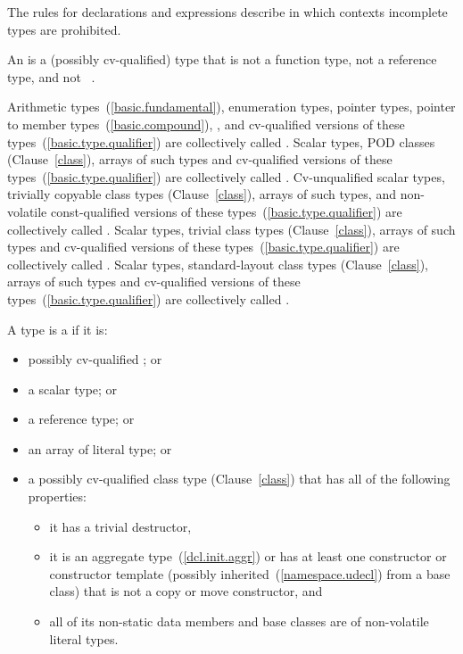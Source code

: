 \pnum
\enternote The rules for declarations and expressions describe in which
contexts incomplete types are prohibited. \exitnote

\pnum
{}%
An  is a (possibly cv-qualified) type that is not
a function type, not a reference type, and not \cv\ .

\pnum
Arithmetic types~(\ref{basic.fundamental}), enumeration types, pointer
types, pointer to member types~(\ref{basic.compound}),
,
and
cv-qualified versions of these
types~(\ref{basic.type.qualifier}) are collectively called
%
. Scalar types,
POD classes (Clause~\ref{class}), arrays of such types and
cv-qualified versions of these
types~(\ref{basic.type.qualifier}) are collectively called
%
.
Cv-unqualified scalar types, trivially copyable class types (Clause~\ref{class}), arrays of
such types, and non-volatile const-qualified versions of these
types~(\ref{basic.type.qualifier}) are collectively called .
Scalar types, trivial class types (Clause~\ref{class}),
arrays of such types and cv-qualified versions of these
types~(\ref{basic.type.qualifier}) are collectively called
. Scalar types, standard-layout class
types (Clause~\ref{class}), arrays of such types and
cv-qualified versions of these types~(\ref{basic.type.qualifier})
are collectively called .

\pnum
A type is a  if it is:

\begin{itemize}
\item possibly cv-qualified ; or
\item a scalar type; or
\item a reference type; or
\item an array of literal type; or
\item a possibly cv-qualified class type (Clause~\ref{class}) that
has all of the following properties:
\begin{itemize}
\item it has a trivial destructor,
\item it is an aggregate type~(\ref{dcl.init.aggr}) or has
at least one  constructor or constructor template
(possibly inherited~(\ref{namespace.udecl}) from a base class)
that is not a copy or move constructor, and
\item all of its non-static data members and base classes are
of non-volatile literal types.
\end{itemize}
\end{itemize}

